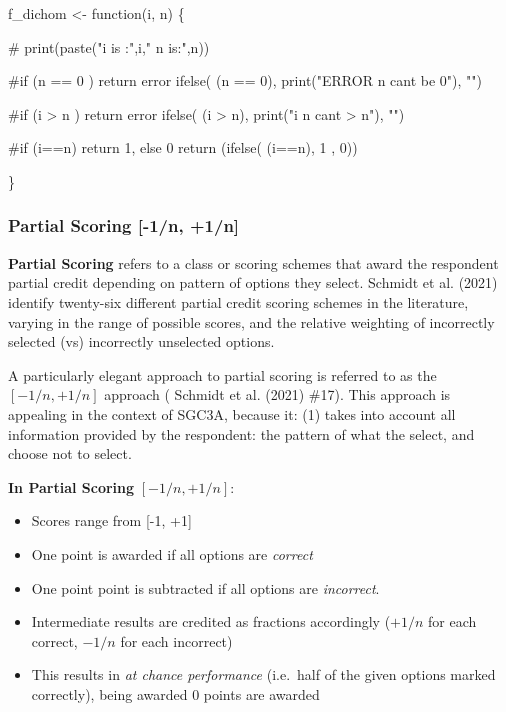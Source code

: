 \documentclass[
  letterpaper,
  DIV=11,
  numbers=noendperiod]{scrreprt}
\newenvironment{Shaded}{\begin{snugshade}}{\end{snugshade}}
\newcommand{\CommentTok}[1]{\textcolor[rgb]{0.37,0.37,0.37}{#1}}
\newcommand{\ControlFlowTok}[1]{\textcolor[rgb]{0.00,0.23,0.31}{#1}}
\newcommand{\DecValTok}[1]{\textcolor[rgb]{0.68,0.00,0.00}{#1}}
\newcommand{\FunctionTok}[1]{\textcolor[rgb]{0.28,0.35,0.67}{#1}}
\newcommand{\NormalTok}[1]{\textcolor[rgb]{0.00,0.23,0.31}{#1}}
\newcommand{\OtherTok}[1]{\textcolor[rgb]{0.00,0.23,0.31}{#1}}
\newcommand{\SpecialCharTok}[1]{\textcolor[rgb]{0.37,0.37,0.37}{#1}}
\newcommand{\StringTok}[1]{\textcolor[rgb]{0.13,0.47,0.30}{#1}}
\providecommand{\tightlist}{%
  \setlength{\itemsep}{0pt}\setlength{\parskip}{0pt}}\usepackage{longtable,booktabs,array}
\begin{document}
\begin{Shaded}
\begin{Highlighting}[]
\NormalTok{f\_dichom }\OtherTok{\textless{}{-}} \ControlFlowTok{function}\NormalTok{(i, n) \{}
 
  \CommentTok{\# print(paste("i is :",i," n is:",n)) }
  
  \CommentTok{\#if (n == 0 ) return error }
  \FunctionTok{ifelse}\NormalTok{( (n }\SpecialCharTok{==} \DecValTok{0}\NormalTok{), }\FunctionTok{print}\NormalTok{(}\StringTok{"ERROR n can\textquotesingle{}t be 0"}\NormalTok{), }\StringTok{""}\NormalTok{)}
  
  \CommentTok{\#if (i \textgreater{} n ) return error }
  \FunctionTok{ifelse}\NormalTok{( (i }\SpecialCharTok{\textgreater{}}\NormalTok{ n), }\FunctionTok{print}\NormalTok{(}\StringTok{"i n can\textquotesingle{}t \textgreater{} n"}\NormalTok{), }\StringTok{""}\NormalTok{)}
  
  \CommentTok{\#if (i==n) return 1, else 0}
  \FunctionTok{return}\NormalTok{ (}\FunctionTok{ifelse}\NormalTok{( (i}\SpecialCharTok{==}\NormalTok{n), }\DecValTok{1}\NormalTok{ , }\DecValTok{0}\NormalTok{))}
 
\NormalTok{\}}
\end{Highlighting}
\end{Shaded}

\hypertarget{partial-scoring--1n-1n}{%
\subsubsection{Partial Scoring {[}-1/n,
+1/n{]}}\label{partial-scoring--1n-1n}}

\textbf{Partial Scoring} refers to a class or scoring schemes that award
the respondent partial credit depending on pattern of options they
select. Schmidt et al. (2021) identify twenty-six different partial
credit scoring schemes in the literature, varying in the range of
possible scores, and the relative weighting of incorrectly selected (vs)
incorrectly unselected options.

A particularly elegant approach to partial scoring is referred to as the
\([-1/n, +1/n]\) approach ( Schmidt et al. (2021) \#17). This approach
is appealing in the context of SGC3A, because it: (1) takes into account
all information provided by the respondent: the pattern of what the
select, and choose not to select.

\textbf{In Partial Scoring} \([-1/n, +1/n]\):

\begin{itemize}
\tightlist
\item
  Scores range from {[}-1, +1{]}
\item
  One point is awarded if all options are \emph{correct}
\item
  One point point is subtracted if all options are \emph{incorrect}.
\item
  Intermediate results are credited as fractions accordingly (\(+1/n\)
  for each correct, \(-1/n\) for each incorrect)
\item
  This results in \emph{at chance performance} (i.e.~half of the given
  options marked correctly), being awarded 0 points are awarded
\end{itemize}
\end{document}
